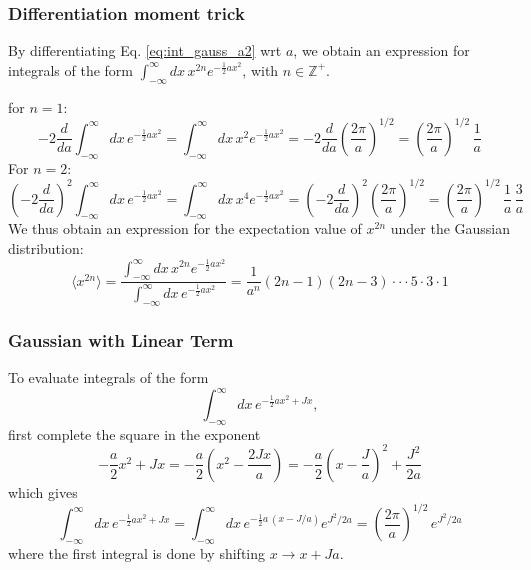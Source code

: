 \documentclass[11pt]{article}
\begin{document}
\subsubsection{Differentiation moment trick}
By differentiating Eq. \ref{eq:int_gauss_a2} wrt $a$, we obtain an expression for
integrals of the form $\int_{-\infty}^{\infty}dx \, x^{2n} e^{-\frac{1}{2} a x^2}$, with
$n \in \mathbb{Z^+}$.

\eeg for $n=1$:
\begin{equation}
  - 2 \frac{d}{da} \int_{-\infty}^{\infty}dx \, e^{-\frac{1}{2} a x^2} =
  \int_{-\infty}^{\infty}dx \, x^2 e^{-\frac{1}{2} a x^2} =
  - 2 \frac{d}{da} \left( \frac{2\pi}{a} \right)^{1/2} =
  \left( \frac{2\pi}{a} \right)^{1/2} \, \frac{1}{a} 
\end{equation}
For $n=2$:
\begin{equation}
  \left(- 2 \frac{d}{da}\right)^2 \int_{-\infty}^{\infty}dx \, e^{-\frac{1}{2} a x^2} =
  \int_{-\infty}^{\infty}dx \, x^4 e^{-\frac{1}{2} a x^2} =
  \left(- 2 \frac{d}{da}\right)^2 \left( \frac{2\pi}{a} \right)^{1/2} =
  \left(\frac{2\pi}{a} \right)^{1/2} \, \frac{1}{a} \, \frac{3}{a}
\end{equation}
We thus obtain an expression for the expectation value of $x^{2n}$ under the Gaussian
distribution: 
\begin{equation}
  \langle x^{2n} \rangle =
  \frac{\int_{-\infty}^{\infty}dx \, x^{2n} e^{-\frac{1}{2} a x^2}}
       {\int_{-\infty}^{\infty}dx \, e^{-\frac{1}{2} a x^2}} =
  \frac{1}{a^n} (2n-1) (2n-3) \cdot\cdot\cdot 5 \cdot 3 \cdot 1
\end{equation}

\subsubsection{Gaussian with Linear Term}
To evaluate integrals of the form
\begin{equation}
  \label{eq:int_gauss_a2_j}
  \int_{-\infty}^{\infty} dx\, e^{-\frac{1}{2} a x^2 + J x},
\end{equation}
first complete the square in the exponent
\begin{equation}
  -\frac{a}{2} x^2 + J x = -\frac{a}{2} (x^2 - \frac{2Jx}{a}) =
  -\frac{a}{2} \left(x - \frac{J}{a}\right)^2 + \frac{J^2}{2a}
\end{equation}
which gives
\begin{equation}
  \int_{-\infty}^{\infty} dx\, e^{-\frac{1}{2} a x^2 + J x} =
  \int_{-\infty}^{\infty} dx\, e^{-\frac{1}{2} a\, \left(x - J/a \right)} e^{J^2 / 2a} =
  \left(\frac{2\pi}{a} \right)^{1/2} \, e^{J^2 / 2a}
\end{equation}
where the first integral is done by shifting $x \to x + J a$.
\end{document}
